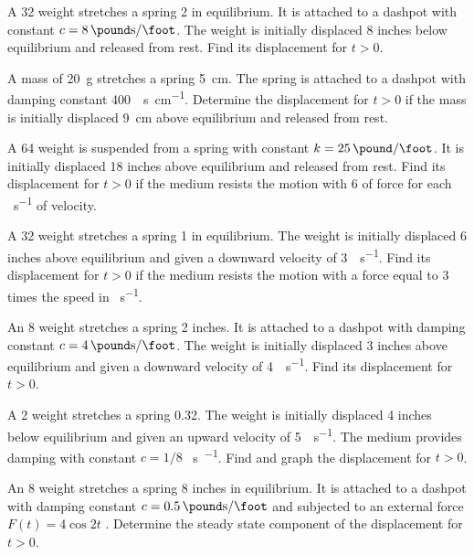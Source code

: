 \begin{exerciselist}
\item\label{exer:6.2.7}A \qty{32}{\pound} weight stretches a spring \qty{2}{\feet} in equilibrium. It is attached
to a dashpot with constant $c=\qty{8}{\pound\second\per\foot}$. The weight is initially
displaced 8 inches below equilibrium and released from rest. Find its
displacement for $t>0$.

\item\label{exer:6.2.8}A mass of \qty{20}{\gram} stretches a  spring \qty{5}{\centi\meter}.  The spring
is attached to a dashpot with damping constant \qty{400}{\dyne\second\per\centi\meter}.  Determine
the displacement for $t>0$ if the mass is  initially displaced
\qty{9}{\centi\meter} above equilibrium and released from rest.

\item\label{exer:6.2.9}A \qty{64}{\pound} weight is suspended from a spring with constant $k=\qty{25}{\pound\per\foot}$.
It is initially displaced 18 inches above equilibrium and released
from rest. Find its displacement for $t>0$ if the medium resists the
motion with \qty{6}{\pound} of force for each \unit{\foot\per\second} of velocity.

\item\label{exer:6.2.10}A \qty{32}{\pound} weight stretches a spring \qty{1}{\foot} in equilibrium. The weight is
initially displaced 6 inches above equilibrium and given a downward
velocity of \qty{3}{\feet\per\second}. Find its displacement for $t>0$ if the medium
resists the motion with a force  equal to 3 times the speed
in \unit{\feet\per\second}.

\item\label{exer:6.2.11}An \qty{8}{\pound} weight stretches a spring 2 inches. It is attached to a
dashpot with damping constant $c=\qty{4}{\pound\second\per\foot}$. The weight is
initially displaced 3 inches above equilibrium and given a downward
velocity of \qty{4}{\feet\per\second}. Find its displacement for $t>0$.

\item\label{exer:6.2.12}\CGex
A \qty{2}{\pound} weight stretches a spring \qty{.32}{\feet}. The weight is initially
displaced 4 inches below equilibrium and given an upward velocity of \qty{5}{\feet\per\second}. The medium provides damping with constant $c=1/8$ \unit{\pound\second\per\foot}.
Find and graph the displacement for $t>0$.

\item\label{exer:6.2.13}An \qty{8}{\pound} weight stretches a spring 8 inches in equilibrium.
It is attached to a dashpot with damping constant $c=\qty{.5}{\pound\second\per\foot}$
and subjected to an external force  $F(t)=4\cos2t$ \unit{\pound}.
Determine the steady state component of the displacement for $t>0$.


\end{exerciselist}

